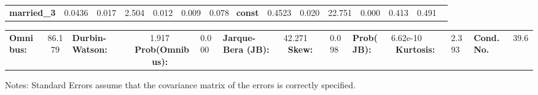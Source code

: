 \begin{center}
\begin{tabular}{lcccccc}
\textbf{married\_3}     &       0.0436  &        0.017     &     2.504  &         0.012        &        0.009    &        0.078     \
\textbf{const}          &       0.4523  &        0.020     &    22.751  &         0.000        &        0.413    &        0.491     \
\bottomrule
\end{tabular}
\begin{tabular}{lclc}
\textbf{Omnibus:}       & 86.179 & \textbf{  Durbin-Watson:     } &    1.917  \
\textbf{Prob(Omnibus):} &  0.000 & \textbf{  Jarque-Bera (JB):  } &   42.271  \
\textbf{Skew:}          &  0.098 & \textbf{  Prob(JB):          } & 6.62e-10  \
\textbf{Kurtosis:}      &  2.393 & \textbf{  Cond. No.          } &     39.6  \
\bottomrule
\end{tabular}
\end{center}

Notes: \newline
 [1] Standard Errors assume that the covariance matrix of the errors is correctly specified.
